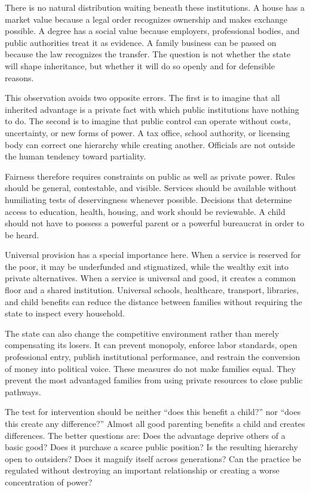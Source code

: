 ﻿\documentclass[12pt,a4paper]{book}
\begin{document}
There is no natural distribution waiting beneath these institutions.  A
house has a market value because a legal order recognizes ownership and
makes exchange possible.  A degree has a social value because employers,
professional bodies, and public authorities treat it as evidence.  A family
business can be passed on because the law recognizes the transfer.  The
question is not whether the state will shape inheritance, but whether it
will do so openly and for defensible reasons.

This observation avoids two opposite errors.  The first is to imagine that
all inherited advantage is a private fact with which public institutions
have nothing to do.  The second is to imagine that public control can
operate without costs, uncertainty, or new forms of power.  A tax office,
school authority, or licensing body can correct one hierarchy while creating
another.  Officials are not outside the human tendency toward partiality.

Fairness therefore requires constraints on public as well as private power.
Rules should be general, contestable, and visible.  Services should be
available without humiliating tests of deservingness whenever possible.
Decisions that determine access to education, health, housing, and work
should be reviewable.  A child should not have to possess a powerful parent
or a powerful bureaucrat in order to be heard.

Universal provision has a special importance here.  When a service is
reserved for the poor, it may be underfunded and stigmatized, while the
wealthy exit into private alternatives.  When a service is universal and
good, it creates a common floor and a shared institution.  Universal schools,
healthcare, transport, libraries, and child benefits can reduce the distance
between families without requiring the state to inspect every household.

The state can also change the competitive environment rather than merely
compensating its losers.  It can prevent monopoly, enforce labor standards,
open professional entry, publish institutional performance, and restrain
the conversion of money into political voice.  These measures do not make
families equal.  They prevent the most advantaged families from using
private resources to close public pathways.

The test for intervention should be neither ``does this benefit a child?''
nor ``does this create any difference?''  Almost all good parenting benefits
a child and creates differences.  The better questions are: Does the
advantage deprive others of a basic good?  Does it purchase a scarce public
position?  Is the resulting hierarchy open to outsiders?  Does it magnify
itself across generations?  Can the practice be regulated without destroying
an important relationship or creating a worse concentration of power?
\end{document}
